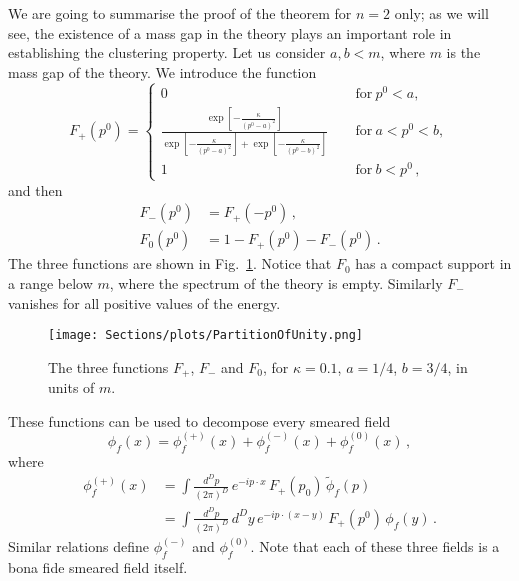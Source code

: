 We are going to summarise the proof of the theorem for $n=2$ only; as we will see, the existence of a 
mass gap in the theory plays an important role in establishing the clustering property. Let us consider 
$a,b<m$, where $m$ is the mass gap of the theory. We introduce the function 
\begin{equation}
    \label{eq:FPlusFunction}
    F_+\left(p^0\right) = 
    \begin{cases}
        0\, &\quad \mathrm{for}\ p^0<a , \\
        \frac{\exp\left[-\frac{\kappa}{\left(p^0-a\right)^2}\right]}
        {\exp\left[-\frac{\kappa}{\left(p^0-a\right)^2}\right] + \exp\left[-\frac{\kappa}{\left(p^0-b\right)^2}\right]} 
        \, &\quad \mathrm{for}\ a<p^0<b , \\
        1\, &\quad \mathrm{for}\ b<p^0\, ,
    \end{cases}
\end{equation}
and then 
\begin{align}
    \label{eq:FMinusFunction}
    F_-\left(p^0\right) 
        &= F_+\left(-p^0\right)\, , \\
    \label{eq:FZeroFunction}
    F_0\left(p^0\right)
        &= 1 - F_+\left(p^0\right) - F_-\left(p^0\right)\, .
\end{align}
The three functions are shown in Fig.~\ref{fig:PartitionOfUnity}. 
Notice that $F_0$ has a compact support in a range below $m$, \ie
where the spectrum of the theory is empty. Similarly $F_-$ vanishes 
for all positive values of the energy.  

\begin{figure}[ht]
    \centering
    \texttt{[image: Sections/plots/PartitionOfUnity.png]}
    \caption{The three functions $F_+$, $F_-$ and $F_0$, for 
    $\kappa=0.1$, $a=1/4$, $b=3/4$, in units of $m$.}
    \label{fig:PartitionOfUnity}
\end{figure}

These functions can be used to decompose every smeared field 
\begin{equation}
    \label{eq:FieldDecompF}
    \phi_f(x) = \phi_f^{(+)}(x) + \phi_f^{(-)}(x) + \phi_f^{(0)}(x)\, ,
\end{equation}
where 
\begin{align}
    \phi_f^{(+)}(x) 
        &= \int \frac{d^Dp}{(2\pi)^D}\, e^{-ip\cdot x}\, F_+\left(p_0\right)\, 
        \tilde{\phi}_f\left(p\right) \\
        &= \int \frac{d^Dp}{(2\pi)^D}\, d^Dy\, e^{-ip\cdot (x-y)}\, F_+\left(p^0\right)\,
        \phi_f(y)\, .
\end{align}
Similar relations define $\phi_f^{(-)}$ and $\phi_f^{(0)}$. Note that each of
these three fields is a bona fide smeared field itself. 

